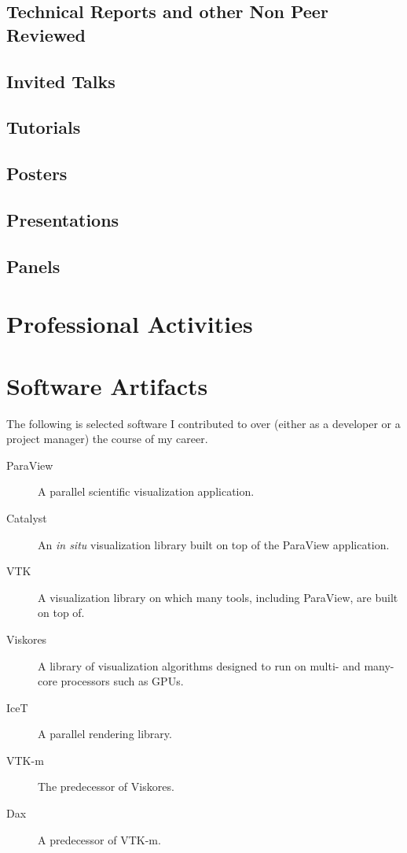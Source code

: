 \documentclass{article}
\begin{document}
\subsection*{Technical Reports and other Non Peer Reviewed}


\subsection*{Invited Talks}


\subsection*{Tutorials}


\subsection*{Posters}



\subsection*{Presentations}



\subsection*{Panels}



\section*{Professional Activities}


\section*{Software Artifacts}

The following is selected software I contributed to over (either as a developer or a project manager) the course of my career.

\begin{description}
\item[ParaView] A parallel scientific visualization application.
\item[Catalyst] An \emph{in situ} visualization library built on top of the ParaView application.
\item[VTK] A visualization library on which many tools, including ParaView, are built on top of.
\item[Viskores] A library of visualization algorithms designed to run on multi- and many-core processors such as GPUs.
\item[IceT] A parallel rendering library.
\item[VTK-m] The predecessor of Viskores.
\item[Dax] A predecessor of VTK-m.
\end{description}
\end{document}
